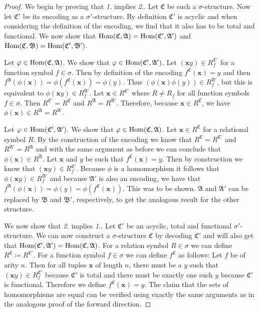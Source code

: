 \begin{proof}
	We begin by proving that \emph{1.} implies \emph{2.}.
	Let $\mathfrak C$ be such a $\sigma$-structure.
	Now let $\mathfrak C'$ be its encoding as a $\sigma'$-structure.
	By definition $\mathfrak C'$ is acyclic and when considering the definition of the encoding, we find that it also has to be total and functional.
	We now show that $\operatorname{Hom}(\mathfrak C,\mathfrak A)=\operatorname{Hom}(\mathfrak C',\mathfrak A')$ and $\operatorname{Hom}(\mathfrak C, \mathfrak B)=\operatorname{Hom}(\mathfrak C',\mathfrak B')$.
	
	Let $\varphi\in\operatorname{Hom}(\mathfrak C,\mathfrak A)$. 
	We show that $\varphi\in\operatorname{Hom}(\mathfrak C',\mathfrak A')$.
	Let $(\mathbf xy)\in R^{\mathfrak C'}_f$ for a function symbol $f\in\sigma$.
	Then by definition of the encoding $f^{\mathfrak C}(\mathbf x)=y$ and then $f^{\mathfrak A}(\phi(\mathbf x))=\phi(f^{\mathfrak C}(\mathbf x))=\phi(y)$.
	Thus $(\phi(\mathbf x)\phi(y))\in R_f^{\mathfrak A'}$, but this is equivalent to $\phi(\mathbf xy)\in R_f^{\mathfrak A'}$.
	Let $\mathbf x\in R^{\mathfrak C'}$ where $R\neq R_f$ for all function symbols $f\in\sigma$.
	Then $R^{\mathfrak C'}=R^{\mathfrak C}$ and $R^{\mathfrak A}=R^{\mathfrak A'}$. 
	Therefore, because $\mathbf x\in R^{\mathfrak C}$, we have $\phi(\mathbf x)\in R^{\mathfrak A}=R^{\mathfrak A'}$. 
	
	Let $\varphi\in \operatorname{Hom}(\mathfrak C',\mathfrak A')$.
	We show that $\varphi\in\operatorname{Hom}(\mathfrak C,\mathfrak A)$.
	Let $\mathbf x\in R^{\mathfrak C}$ for a relational symbol $R$.
	By the construction of the encoding we know that $R^{\mathfrak C}=R^{\mathfrak C'}$ and $R^{\mathfrak A'}=R^{\mathfrak A}$ and with the same argument as before we can conclude that $\phi(\mathbf x)\in R^{\mathfrak A}$.
	Let $\mathbf x$ and $y$ be such that $f^{\mathfrak C}(\mathbf x)=y$.
	Then by construction we know that $(\mathbf xy)\in R_f^{\mathfrak C'}$.
	Because $\phi$ is a homomorphism it follows that $\phi(\mathbf xy)\in R_f^{\mathfrak A'}$ and because $\mathfrak A'$ is also an encoding, we have that $f^{\mathfrak A}(\phi(\mathbf x))=\phi(y)=\phi(f^{\mathfrak C}(\mathbf x))$.
	This was to be shown.
	$\mathfrak A$ and $\mathfrak A'$ can be replaced by $\mathfrak B$ and $\mathfrak B'$, respectively, to get the analogous result for the other structure.
	
	We now show that \emph{2.} implies \emph{1.}.
	Let $\mathfrak C'$ be an acyclic, total and functional $\sigma'$-structure.
	We can now construct a $\sigma$-structure $\mathfrak C$ by decoding $\mathfrak C'$ and will also get that $\operatorname{Hom}(\mathfrak C',\mathfrak A')=\operatorname{Hom}(\mathfrak C,\mathfrak A)$.
	For a relation symbol $R\in\sigma$ we can define $R^{\mathfrak C}\coloneqq R^{\mathfrak C'}$.
	For a function symbol $f\in\sigma$ we can define $f^{\mathfrak C}$ as follows: 
	Let $f$ be of arity $n$. 
	Then for all tuples $\mathbf x$ of length $n$, there must be a $y$ such that $(\mathbf xy)\in R_f^{\mathfrak C'}$ because $\mathfrak C'$ is total and there must be exactly one such $y$ because $\mathfrak C'$ is functional.
	Therefore we define $f^{\mathfrak C}(\mathbf x)=y$.
	The claim that the sets of homomorphisms are equal can be verified using exactly the same arguments as in the analogous proof of the forward direction.
\end{proof}

